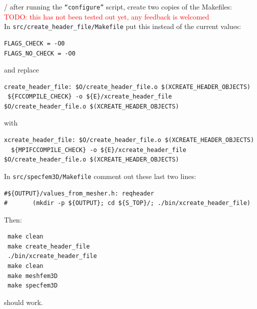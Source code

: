 \documentclass[oneside,english]{book}
\newcommand{\red}[1]{\textcolor{Red}{#1}}
\begin{document}
/ after running the \texttt{``configure''} script, create two copies of the Makefiles:
\\
\red{TODO: this has not been tested out yet, any feedback is welcomed}
\\


\noindent
In \texttt{src/create\_header\_file/Makefile} put this instead of the current values:

\begin{verbatim}
FLAGS_CHECK = -O0
FLAGS_NO_CHECK = -O0
\end{verbatim}

\noindent
and replace

\begin{verbatim}
create_header_file: $O/create_header_file.o $(XCREATE_HEADER_OBJECTS)
 ${FCCOMPILE_CHECK} -o ${E}/xcreate_header_file $O/create_header_file.o $(XCREATE_HEADER_OBJECTS)
\end{verbatim}

\noindent
with

\begin{verbatim}
xcreate_header_file: $O/create_header_file.o $(XCREATE_HEADER_OBJECTS)
  ${MPIFCCOMPILE_CHECK} -o ${E}/xcreate_header_file $O/create_header_file.o $(XCREATE_HEADER_OBJECTS)
\end{verbatim}

\noindent
In \texttt{src/specfem3D/Makefile} comment out these last two lines:

\begin{verbatim}
#${OUTPUT}/values_from_mesher.h: reqheader
#       (mkdir -p ${OUTPUT}; cd ${S_TOP}/; ./bin/xcreate_header_file)
\end{verbatim}

\noindent
Then:

\begin{verbatim}
 make clean
 make create_header_file
 ./bin/xcreate_header_file
 make clean
 make meshfem3D
 make specfem3D
\end{verbatim}

\noindent
should work.
\end{document}
